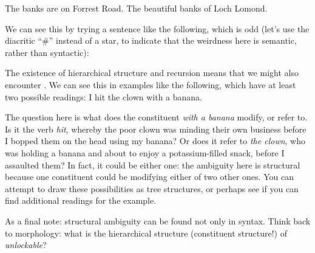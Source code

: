 \documentclass{article}
\begin{document}
\ea
    \ea The banks are on Forrest Road.
    \ex The beautiful banks of Loch Lomond.
    \z
\z

We can see this by trying a sentence like the following, which is odd (let's use the diacritic ``\#'' instead of a star, to indicate that the weirdness here is semantic, rather than syntactic):
\z

The existence of hierarchical structure and recursion means that we might also encounter . We can see this in examples like the following, which have at least two possible readings:
\ea I hit the clown with a banana.
\z

The question here is what does the constituent \emph{with a banana} modify, or refer to. Is it the verb \emph{hit}, whereby the poor clown was minding their own business before I bopped them on the head using my banana? Or does it refer to \emph{the clown}, who was holding a banana and about to enjoy a potassium-filled snack, before I assaulted them? In fact, it could be either one: the ambiguity here is structural because one constituent could be modifying either of two other ones. You can attempt to draw these possibilities as tree structures, or perhaps see if you can find additional readings for the example.

As a final note: structural ambiguity can be found not only in syntax. Think back to morphology: what is the hierarchical structure (constituent structure!) of \emph{unlockable}?



\end{document}
